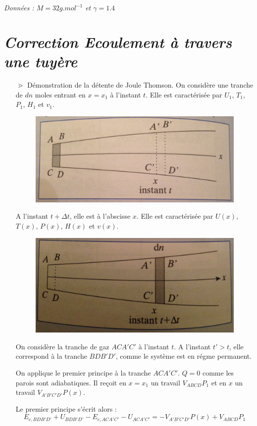 \documentclass{report}
\begin{document}
\textit{Données : $M = 32g.mol^{-1}$ et $\gamma=1.4$}

\newpage

\section*{\textit{Correction Ecoulement à travers une tuyère}}

\begin{itemize}

	\item[$\gtrdot$] Démonstration de la détente de Joule Thomson. On considère une tranche de $dn$ moles entrant en $x=x_1$ à l'instant $t$. Elle est caractérisée par $U_1$, $T_1$, $P_1$, $H_1$ et $v_1$. 
	
\begin{figure}[!h]

\centering
\includegraphics[width=0.4\linewidth]{tuyere1.png}

\end{figure}	

A l'instant $t+\Delta t$, elle est à l'abscisse $x$. Elle est caractérisée par $U(x)$, $T(x)$, $P(x)$, $H(x)$ et $v(x)$. 
	
\begin{figure}[!h]
\centering
\includegraphics[width=0.4\linewidth]{tuyere2.png}
\end{figure}	

On considère la tranche de gaz $ACA'C'$ à l'instant $t$. A l'instant $t'>t$, elle correspond à la tranche $BDB'D'$, comme le système est en régme permanent. 

On applique le premier principe à la tranche $ACA'C'$. $Q=0$ comme les parois sont adiabatiques. 
Il reçoit en $x=x_1$ un travail $V_{ABCD}P_1$ et en $x$ un travail $V_{A'B'C'D'}P(x)$.

Le premier principe s'écrit alors :
\begin{equation}
	E_{c,BDB'D'} + U_{BDB'D'} - E_{c,ACA'C'} - U_{ACA'C'} = -V_{A'B'C'D'}P(x)+V_{ABCD}P_1
\end{equation}


\end{itemize}
\end{document}
